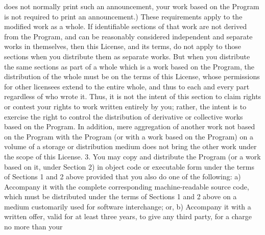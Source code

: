 \begin{DoxyCodeInclude}
\textcolor{stringliteral}{    does not normally print such an announcement, your work based on}
\textcolor{stringliteral}{    the Program is not required to print an announcement.)}
\textcolor{stringliteral}{}
\textcolor{stringliteral}{These requirements apply to the modified work as a whole.  If}
\textcolor{stringliteral}{identifiable sections of that work are not derived from the Program,}
\textcolor{stringliteral}{and can be reasonably considered independent and separate works in}
\textcolor{stringliteral}{themselves, then this License, and its terms, do not apply to those}
\textcolor{stringliteral}{sections when you distribute them as separate works.  But when you}
\textcolor{stringliteral}{distribute the same sections as part of a whole which is a work based}
\textcolor{stringliteral}{on the Program, the distribution of the whole must be on the terms of}
\textcolor{stringliteral}{this License, whose permissions for other licensees extend to the}
\textcolor{stringliteral}{entire whole, and thus to each and every part regardless of who wrote it.}
\textcolor{stringliteral}{}
\textcolor{stringliteral}{Thus, it is not the intent of this section to claim rights or contest}
\textcolor{stringliteral}{your rights to work written entirely by you; rather, the intent is to}
\textcolor{stringliteral}{exercise the right to control the distribution of derivative or}
\textcolor{stringliteral}{collective works based on the Program.}
\textcolor{stringliteral}{}
\textcolor{stringliteral}{In addition, mere aggregation of another work not based on the Program}
\textcolor{stringliteral}{with the Program (or with a work based on the Program) on a volume of}
\textcolor{stringliteral}{a storage or distribution medium does not bring the other work under}
\textcolor{stringliteral}{the scope of this License.}
\textcolor{stringliteral}{}
\textcolor{stringliteral}{  3. You may copy and distribute the Program (or a work based on it,}
\textcolor{stringliteral}{under Section 2) in object code or executable form under the terms of}
\textcolor{stringliteral}{Sections 1 and 2 above provided that you also do one of the following:}
\textcolor{stringliteral}{}
\textcolor{stringliteral}{    a) Accompany it with the complete corresponding machine-readable}
\textcolor{stringliteral}{    source code, which must be distributed under the terms of Sections}
\textcolor{stringliteral}{    1 and 2 above on a medium customarily used for software interchange; or,}
\textcolor{stringliteral}{}
\textcolor{stringliteral}{    b) Accompany it with a written offer, valid for at least three}
\textcolor{stringliteral}{    years, to give any third party, for a charge no more than your}

\end{DoxyCodeInclude}
